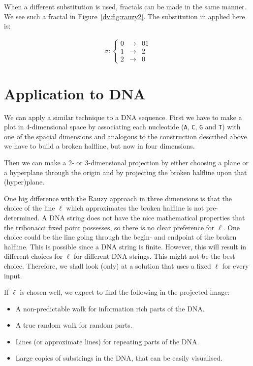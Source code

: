 \documentclass[oribibl]{lncs/llncs}
\begin{document}
When a different substitution is used, fractals can be made in the same
manner. We see such a fractal in Figure~\ref{dv:fig:rauzy2}. The substitution
in applied here is:

\begin{eqnarray*}
\sigma: \left\{ \begin{array}{lll}
0 &\rightarrow& 01\\
1 &\rightarrow& 2\\
2 &\rightarrow& 0
\end{array} \right.
\end{eqnarray*}

\section{Application to DNA}\label{dv:sec:dna}
We can apply a similar technique to a DNA sequence. First we have to
make a plot in 4-dimensional space by associating each nucleotide (\texttt{A},
\texttt{C}, \texttt{G} and \texttt{T}) with one of the spacial dimensions and
analogous to the construction described above we have to build a broken
halfline, but now in four dimensions.

Then we can make a 2- or 3-dimensional projection by either choosing a plane or
a hyperplane through the origin and by projecting the broken halfline upon that
(hyper)plane.

One big difference with the Rauzy approach in three dimensions is that the
choice of the line $\ell$ which approximates the broken halfline is not
pre-determined. A DNA string does not have the nice mathematical properties
that the tribonacci fixed point possesses, so there is no clear preference for
$\ell$. One choice could be the line going through the begin- and endpoint of
the broken halfline. This is possible since a DNA string is finite. However,
this will result in different choices for $\ell$ for different DNA strings.
This might not be the best choice. Therefore, we shall look (only) at a
solution that uses a fixed $\ell$ for every input.

If $\ell$ is chosen well, we expect to find the following in the projected
image:
\begin{itemize}
\item A non-predictable walk for information rich parts of the DNA.
\item A true random walk for random parts.
\item Lines (or approximate lines) for repeating parts of the DNA.
\item Large copies of substrings in the DNA, that can be easily visualised.
\end{itemize}
\end{document}
